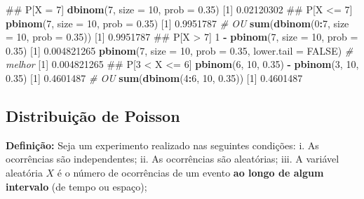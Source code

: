 \documentclass[10pt,a4paper]{book}
\newenvironment{Shaded}{\begin{snugshade}}{\end{snugshade}}
\newcommand{\KeywordTok}[1]{\textcolor[rgb]{0.13,0.29,0.53}{\textbf{#1}}}
\newcommand{\DataTypeTok}[1]{\textcolor[rgb]{0.13,0.29,0.53}{#1}}
\newcommand{\DecValTok}[1]{\textcolor[rgb]{0.00,0.00,0.81}{#1}}
\newcommand{\FloatTok}[1]{\textcolor[rgb]{0.00,0.00,0.81}{#1}}
\newcommand{\StringTok}[1]{\textcolor[rgb]{0.31,0.60,0.02}{#1}}
\newcommand{\CommentTok}[1]{\textcolor[rgb]{0.56,0.35,0.01}{\textit{#1}}}
\newcommand{\OtherTok}[1]{\textcolor[rgb]{0.56,0.35,0.01}{#1}}
\newcommand{\OperatorTok}[1]{\textcolor[rgb]{0.81,0.36,0.00}{\textbf{#1}}}
\newcommand{\NormalTok}[1]{#1}
\begin{document}
\begin{Shaded}
\begin{Highlighting}[]
\NormalTok{## P[X = 7]}
\KeywordTok{dbinom}\NormalTok{(}\DecValTok{7}\NormalTok{, }\DataTypeTok{size =} \DecValTok{10}\NormalTok{, }\DataTypeTok{prob =} \FloatTok{0.35}\NormalTok{)}
\NormalTok{[}\DecValTok{1}\NormalTok{] }\FloatTok{0.02120302}
\NormalTok{## P[X <= 7]}
\KeywordTok{pbinom}\NormalTok{(}\DecValTok{7}\NormalTok{, }\DataTypeTok{size =} \DecValTok{10}\NormalTok{, }\DataTypeTok{prob =} \FloatTok{0.35}\NormalTok{)}
\NormalTok{[}\DecValTok{1}\NormalTok{] }\FloatTok{0.9951787}
\CommentTok{# OU}
\KeywordTok{sum}\NormalTok{(}\KeywordTok{dbinom}\NormalTok{(}\DecValTok{0}\OperatorTok{:}\DecValTok{7}\NormalTok{, }\DataTypeTok{size =} \DecValTok{10}\NormalTok{, }\DataTypeTok{prob =} \FloatTok{0.35}\NormalTok{))}
\NormalTok{[}\DecValTok{1}\NormalTok{] }\FloatTok{0.9951787}
\NormalTok{## P[X > 7]}
\DecValTok{1} \OperatorTok{-}\StringTok{ }\KeywordTok{pbinom}\NormalTok{(}\DecValTok{7}\NormalTok{, }\DataTypeTok{size =} \DecValTok{10}\NormalTok{, }\DataTypeTok{prob =} \FloatTok{0.35}\NormalTok{)}
\NormalTok{[}\DecValTok{1}\NormalTok{] }\FloatTok{0.004821265}
\KeywordTok{pbinom}\NormalTok{(}\DecValTok{7}\NormalTok{, }\DataTypeTok{size =} \DecValTok{10}\NormalTok{, }\DataTypeTok{prob =} \FloatTok{0.35}\NormalTok{, }\DataTypeTok{lower.tail =} \OtherTok{FALSE}\NormalTok{) }\CommentTok{# melhor}
\NormalTok{[}\DecValTok{1}\NormalTok{] }\FloatTok{0.004821265}
\NormalTok{## P[3 < X <= 6]}
\KeywordTok{pbinom}\NormalTok{(}\DecValTok{6}\NormalTok{, }\DecValTok{10}\NormalTok{, }\FloatTok{0.35}\NormalTok{) }\OperatorTok{-}\StringTok{ }\KeywordTok{pbinom}\NormalTok{(}\DecValTok{3}\NormalTok{, }\DecValTok{10}\NormalTok{, }\FloatTok{0.35}\NormalTok{)}
\NormalTok{[}\DecValTok{1}\NormalTok{] }\FloatTok{0.4601487}
\CommentTok{# OU}
\KeywordTok{sum}\NormalTok{(}\KeywordTok{dbinom}\NormalTok{(}\DecValTok{4}\OperatorTok{:}\DecValTok{6}\NormalTok{, }\DecValTok{10}\NormalTok{, }\FloatTok{0.35}\NormalTok{))}
\NormalTok{[}\DecValTok{1}\NormalTok{] }\FloatTok{0.4601487}
\end{Highlighting}
\end{Shaded}

\subsection{Distribuição de
Poisson}\label{distribuiuxe7uxe3o-de-poisson}

\textbf{Definição:} Seja um experimento realizado nas seguintes
condições: i. As ocorrências são independentes; ii. As ocorrências são
aleatórias; iii. A variável aleatória \(X\) é o número de ocorrências de
um evento \textbf{ao longo de algum intervalo} (de tempo ou espaço);
\end{document}
